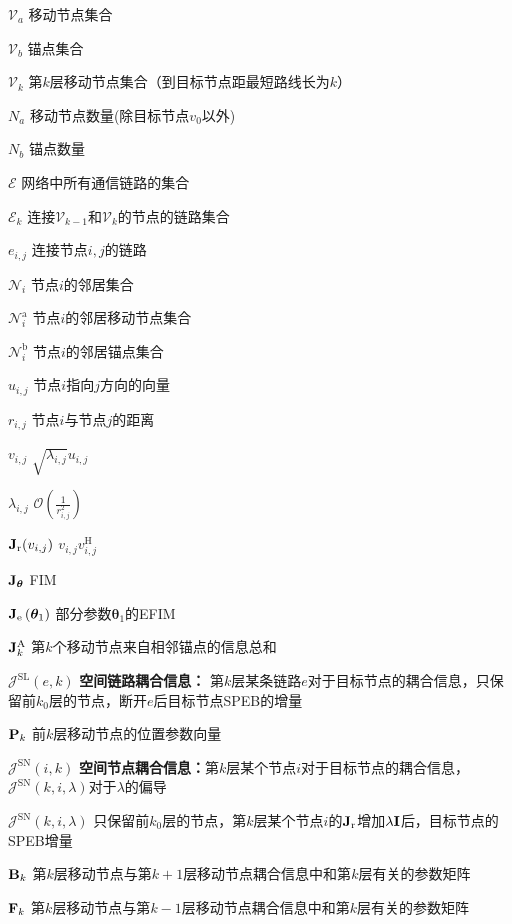 \documentclass{article}%
\newcommand\V[1]{\mathrm{\bf{#1}}}
\newcommand\Tx[1]{\mathrm{#1}}
\newcommand\Se[1]{\mathcal{#1}}
\newcommand\SB[1]{\left(#1\right)}
\begin{document}
\begin{denotation}[3cm]
  \item[$\Se{V}_a$] 移动节点集合
  \item[$\Se{V}_b$] 锚点集合
  \item[$\Se{V}_k$] 第$k$层移动节点集合（到目标节点距最短路线长为$k$）
  \item[$N_a$] 移动节点数量(除目标节点$v_0$以外)
  \item[$N_b$] 锚点数量
  \item[$\Se{E}$] 网络中所有通信链路的集合
  \item[$\Se{E}_k$] 连接$\Se{V}_{k-1}$和$\Se{V}_k$的节点的链路集合
  \item[$e_{i,j}$] 连接节点$i,j$的链路
  \item[$\Se{N}_i$] 节点$i$的邻居集合
  \item[$\Se{N}_i^{\Tx{a}}$] 节点$i$的邻居移动节点集合
  \item[$\Se{N}_i^{\Tx{b}}$] 节点$i$的邻居锚点集合
  \item[$u_{i,j}$] 节点$i$指向$j$方向的向量
  \item[$r_{i,j}$] 节点$i$与节点$j$的距离
  \item[$v_{i,j}$] $\sqrt{\lambda_{i,j}}u_{i,j}$
  \item[$\lambda_{i,j}$] $\Se{O}\SB{\frac{1}{r^2_{i,j}}}$
  \item[$\V{J}_{\Tx{r}}(v_{i,j})$] $v_{i,j}v_{i,j}^{\Tx{H}}$
  \item[$\V{J}_{\bm{\theta}}$] FIM
  \item[$\V{J}_{\Tx{e}} \SB{\bm{\theta}_1}$] 部分参数$\bm{\theta}_1$的EFIM
  \item[$\V{J}^{\Tx{A}}_k$] 第$k$个移动节点来自相邻锚点的信息总和
  \item[$\Se{J}^{\Tx{SL}}(e,k)$] \textbf{空间链路耦合信息：} 第$k$层某条链路$e$对于目标节点的耦合信息，只保留前$k_0$层的节点，断开$e$后目标节点SPEB的增量
  \item[$\V{P}_k$] 前$k$层移动节点的位置参数向量
  \item[$\Se{J}^{\Tx{SN}}(i,k)$] \textbf{空间节点耦合信息：}第$k$层某个节点$i$对于目标节点的耦合信息，$\Se{J}^{\Tx{SN}}(k,i,\lambda)$对于$\lambda$的偏导
  \item[$\Se{J}^{\Tx{SN}}(k,i,\lambda)$]只保留前$k_0$层的节点，第$k$层某个节点$i$的$\V{J}_{\Tx{r}}$增加$\lambda\V{I}$后，目标节点的SPEB增量
  \item[$\V{B}_k$] 第$k$层移动节点与第$k+1$层移动节点耦合信息中和第$k$层有关的参数矩阵
  \item[$\V{F}_k$] 第$k$层移动节点与第$k-1$层移动节点耦合信息中和第$k$层有关的参数矩阵

\end{denotation}
\end{document}
